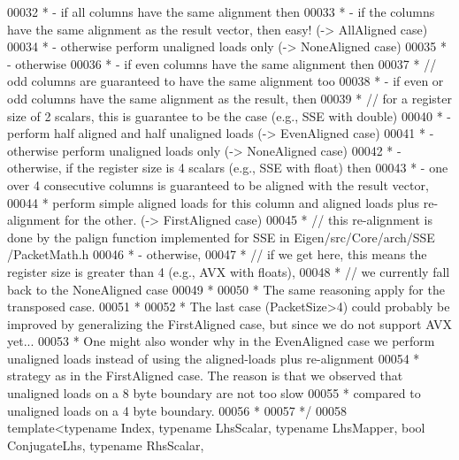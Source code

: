 \begin{DoxyCode}
00032 \textcolor{comment}{ * - if all columns have the same alignment then}
00033 \textcolor{comment}{ *   - if the columns have the same alignment as the result vector, then easy! (-> AllAligned case)}
00034 \textcolor{comment}{ *   - otherwise perform unaligned loads only (-> NoneAligned case)}
00035 \textcolor{comment}{ * - otherwise}
00036 \textcolor{comment}{ *   - if even columns have the same alignment then}
00037 \textcolor{comment}{ *     // odd columns are guaranteed to have the same alignment too}
00038 \textcolor{comment}{ *     - if even or odd columns have the same alignment as the result, then}
00039 \textcolor{comment}{ *       // for a register size of 2 scalars, this is guarantee to be the case (e.g., SSE with double)}
00040 \textcolor{comment}{ *       - perform half aligned and half unaligned loads (-> EvenAligned case)}
00041 \textcolor{comment}{ *     - otherwise perform unaligned loads only (-> NoneAligned case)}
00042 \textcolor{comment}{ *   - otherwise, if the register size is 4 scalars (e.g., SSE with float) then}
00043 \textcolor{comment}{ *     - one over 4 consecutive columns is guaranteed to be aligned with the result vector,}
00044 \textcolor{comment}{ *       perform simple aligned loads for this column and aligned loads plus re-alignment for the other.
       (-> FirstAligned case)}
00045 \textcolor{comment}{ *       // this re-alignment is done by the palign function implemented for SSE in Eigen/src/Core/arch/SSE
      /PacketMath.h}
00046 \textcolor{comment}{ *   - otherwise,}
00047 \textcolor{comment}{ *     // if we get here, this means the register size is greater than 4 (e.g., AVX with floats),}
00048 \textcolor{comment}{ *     // we currently fall back to the NoneAligned case}
00049 \textcolor{comment}{ *}
00050 \textcolor{comment}{ * The same reasoning apply for the transposed case.}
00051 \textcolor{comment}{ *}
00052 \textcolor{comment}{ * The last case (PacketSize>4) could probably be improved by generalizing the FirstAligned case, but since
       we do not support AVX yet...}
00053 \textcolor{comment}{ * One might also wonder why in the EvenAligned case we perform unaligned loads instead of using the
       aligned-loads plus re-alignment}
00054 \textcolor{comment}{ * strategy as in the FirstAligned case. The reason is that we observed that unaligned loads on a 8 byte
       boundary are not too slow}
00055 \textcolor{comment}{ * compared to unaligned loads on a 4 byte boundary.}
00056 \textcolor{comment}{ *}
00057 \textcolor{comment}{ */}
00058 \textcolor{keyword}{template}<\textcolor{keyword}{typename} Index, \textcolor{keyword}{typename} LhsScalar, \textcolor{keyword}{typename} LhsMapper, \textcolor{keywordtype}{bool} ConjugateLhs, \textcolor{keyword}{typename} RhsScalar, \textcolor{keyword}{
}
\end{DoxyCode}
